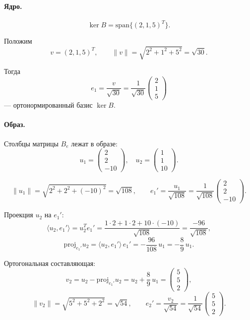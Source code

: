 \documentclass[12pt]{article}
\begin{document}
\paragraph*{Ядро.}
\[
	\ker B = \mathrm{span}\{(2,1,5)^T\}.
\]

Положим
\[
	v = (2,1,5)^T,
	\qquad
	\|v\| = \sqrt{2^2 + 1^2 + 5^2} = \sqrt{30}.
\]

Тогда
\[
	e_1 = \frac{v}{\sqrt{30}}
	= \frac{1}{\sqrt{30}}
	\begin{pmatrix}
		2 \\1\\5
	\end{pmatrix}
\]
— ортонормированный базис \(\ker B\).

\paragraph*{Образ.}
Столбцы матрицы \(B_e\) лежат в образе:
\[
	u_1 = \begin{pmatrix}2\\2\\-10\end{pmatrix},
	\quad
	u_2 = \begin{pmatrix}1\\1\\10\end{pmatrix}.
\]

\[
	\|u_1\| = \sqrt{2^2 + 2^2 + (-10)^2} = \sqrt{108},
	\qquad
	e_1' = \frac{u_1}{\sqrt{108}}
	= \frac{1}{\sqrt{108}}
	\begin{pmatrix}
		2 \\2\\-10
	\end{pmatrix}.
\]

Проекция \(u_2\) на \(e_1'\):
\[
	\langle u_2,e_1'\rangle
	= u_2^T e_1'
	= \frac{1\cdot2 + 1\cdot2 + 10\cdot(-10)}{\sqrt{108}}
	= \frac{-96}{\sqrt{108}},
\]
\[
	\mathrm{proj}_{e_1'}u_2
	= \langle u_2,e_1'\rangle\,e_1'
	= -\frac{96}{108}\,u_1
	= -\frac{8}{9}\,u_1.
\]

Ортогональная составляющая:
\[
	v_2 = u_2 - \mathrm{proj}_{e_1'}u_2
	= u_2 + \frac{8}{9}\,u_1
	= \begin{pmatrix}5\\5\\2\end{pmatrix},
\]
\[
	\|v_2\| = \sqrt{5^2 + 5^2 + 2^2} = \sqrt{54},
	\qquad
	e_2' = \frac{v_2}{\sqrt{54}}
	= \frac{1}{\sqrt{54}}
	\begin{pmatrix}
		5 \\5\\2
	\end{pmatrix}.
\]
\end{document}
